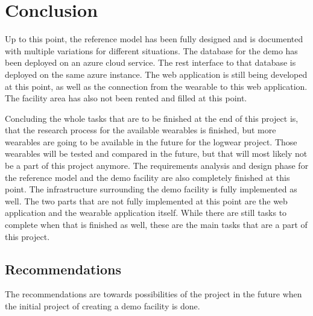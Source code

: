\chapter{Conclusion}\label{cha:conclusion}
Up to this point, the reference model has been fully designed and is documented with multiple variations for different situations. The database for the demo has been deployed on an azure cloud service. The \gls{rest} interface to that database is deployed on the same azure instance. The web application is still being developed at this point, as well as the connection from the wearable to this web application. The facility area has also not been rented and filled at this point. 

Concluding the whole tasks that are to be finished at the end of this project is, that the research process for the available wearables is finished, but more wearables are going to be available in the future for the logwear project. Those wearables will be tested and compared in the future, but that will most likely not be a part of this project anymore. The requirements analysis and design phase for the reference model and the demo facility are also completely finished at this point. The infrastructure surrounding the demo facility is fully implemented as well. The two parts that are not fully implemented at this point are the web application and the wearable application itself. While there are still tasks to complete when that is finished as well, these are the main tasks that are a part of this project.





\section{Recommendations}\label{sec:recommendations}
The recommendations are towards possibilities of the project in the future when the initial project of creating a demo facility is done.


